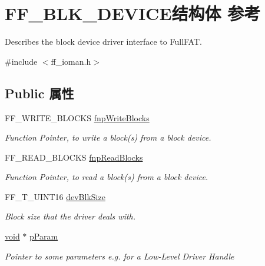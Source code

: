 \hypertarget{struct_f_f___b_l_k___d_e_v_i_c_e}{}\section{F\+F\+\_\+\+B\+L\+K\+\_\+\+D\+E\+V\+I\+C\+E结构体 参考}
\label{struct_f_f___b_l_k___d_e_v_i_c_e}


Describes the block device driver interface to Full\+F\+AT.  




{\ttfamily \#include $<$ff\+\_\+ioman.\+h$>$}

\subsection*{Public 属性}
\begin{DoxyCompactItemize}
\item 
\mbox{\label{struct_f_f___b_l_k___d_e_v_i_c_e_a04aa48b07b62466e85952bf0718bf8aa}} 
F\+F\+\_\+\+W\+R\+I\+T\+E\+\_\+\+B\+L\+O\+C\+KS \hyperlink{struct_f_f___b_l_k___d_e_v_i_c_e_a04aa48b07b62466e85952bf0718bf8aa}{fnp\+Write\+Blocks}
\begin{DoxyCompactList}\small\item\em Function Pointer, to write a block(s) from a block device. \end{DoxyCompactList}\item 
\mbox{\label{struct_f_f___b_l_k___d_e_v_i_c_e_a779a60793ae605d0fbbc2240b1a816e4}} 
F\+F\+\_\+\+R\+E\+A\+D\+\_\+\+B\+L\+O\+C\+KS \hyperlink{struct_f_f___b_l_k___d_e_v_i_c_e_a779a60793ae605d0fbbc2240b1a816e4}{fnp\+Read\+Blocks}
\begin{DoxyCompactList}\small\item\em Function Pointer, to read a block(s) from a block device. \end{DoxyCompactList}\item 
\mbox{\label{struct_f_f___b_l_k___d_e_v_i_c_e_ae6e48e6aa8c6735c8f35a16b15a380d1}} 
F\+F\+\_\+\+T\+\_\+\+U\+I\+N\+T16 \hyperlink{struct_f_f___b_l_k___d_e_v_i_c_e_ae6e48e6aa8c6735c8f35a16b15a380d1}{dev\+Blk\+Size}
\begin{DoxyCompactList}\small\item\em Block size that the driver deals with. \end{DoxyCompactList}\item 
\mbox{\label{struct_f_f___b_l_k___d_e_v_i_c_e_ac9abc1a91587ba708da7e56dc322e65c}} 
\hyperlink{interfacevoid}{void} $\ast$ \hyperlink{struct_f_f___b_l_k___d_e_v_i_c_e_ac9abc1a91587ba708da7e56dc322e65c}{p\+Param}
\begin{DoxyCompactList}\small\item\em Pointer to some parameters e.\+g. for a Low-\/\+Level Driver Handle \end{DoxyCompactList}\end{DoxyCompactItemize}


